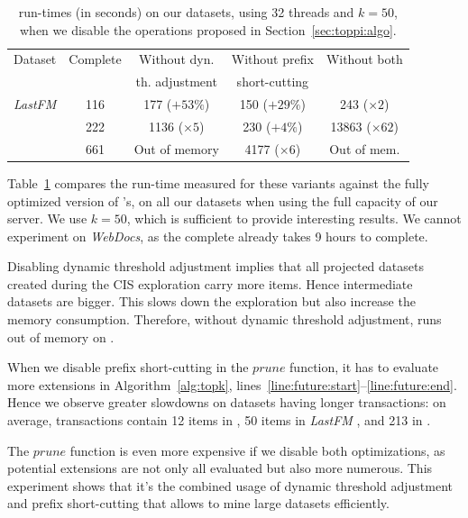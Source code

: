 \begin{table}
	\small
	\centering
	\begin{tabular}{|l|c|c|c|c|}
		\hline
		Dataset   & Complete &  Without dyn.    & Without prefix   &Without both       \\
		          &     \toppi        & th. adjustment  &  short-cutting  &                    \\ \hline
	    {\em LastFM} &        116   &   177   ($+53\%$)     &   150  ($+29\%$)  &  243  ($\times 2$)     \\\hline
	\prodassocreceipt &   222       &      1136  ($\times5$)&   230  ($+4\%$)   &  13863 ($\times 62$) \\\hline
	\prodassocclient &   661       &   Out of memory       & 4177   ($\times 6$) &  Out of mem. \\\hline
	\end{tabular}
	\caption{\label{fig:xp:optims}
		\toppi run-times (in seconds) on our datasets, using 32 threads and $k=50$,
		when we disable the operations proposed in Section~\ref{sec:toppi:algo}.
	}
\end{table}

Table~\ref{fig:xp:optims} compares the run-time measured for these variants
against the fully optimized version of \toppi's,
on all our datasets when using the full capacity of our server.
We use $k=50$, which is sufficient to provide interesting results.
We cannot experiment on {\em WebDocs},
as the complete \toppi already takes 9 hours to complete.

Disabling dynamic threshold adjustment implies that all projected datasets
created during the CIS exploration carry more items.
Hence intermediate datasets are bigger.
This slows down the exploration
but also increase the memory consumption.
Therefore, without dynamic threshold adjustment,
\toppi runs out of memory on \prodassocclient.

When we disable prefix short-cutting in the $\mathit{prune}$ function,
it has to evaluate more extensions in Algorithm~\ref{alg:topk}, lines~\ref{line:future:start}--\ref{line:future:end}.
Hence we observe greater slowdowns on datasets having longer transactions:
on average, transactions contain 12 items in \prodassocreceipt,
50 items in {\em LastFM} , and 213 in \prodassocclient.

The $\mathit{prune}$ function is even more expensive if we disable both optimizations,
as potential extensions are not only all evaluated but also more numerous.
This experiment shows that it's the combined usage of dynamic threshold adjustment
and prefix short-cutting that allows \toppi to mine large datasets efficiently.



